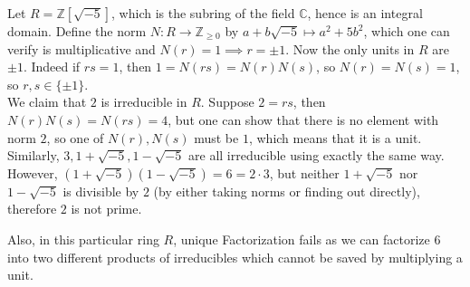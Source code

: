 \begin{example}
    Let $R=\mathbb Z[\sqrt{-5}]$, which is the subring of the field $\mathbb C$, hence is an integral domain.
    Define the norm $N:R\to\mathbb Z_{\ge 0}$ by $a+b\sqrt{-5}\mapsto a^2+5b^2$, which one can verify is multiplicative and $N(r)=1\implies r=\pm 1$.
    Now the only units in $R$ are $\pm 1$.
    Indeed if $rs=1$, then $1=N(rs)=N(r)N(s)$, so $N(r)=N(s)=1$, so $r,s\in\{\pm 1\}$.\\
    We claim that $2$ is irreducible in $R$.
    Suppose $2=rs$, then $N(r)N(s)=N(rs)=4$, but one can show that there is no element with norm $2$, so one of $N(r),N(s)$ must be $1$, which means that it is a unit.
    Similarly, $3,1+\sqrt{-5},1-\sqrt{-5}$ are all irreducible using exactly the same way.
    However, $(1+\sqrt{-5})(1-\sqrt{-5})=6=2\cdot 3$, but neither $1+\sqrt{-5}$ nor $1-\sqrt{-5}$ is divisible by $2$ (by either taking norms or finding out directly), therefore $2$ is not prime.
\end{example}
Also, in this particular ring $R$, unique Factorization fails as we can factorize $6$ into two different products of irreducibles which cannot be saved by multiplying a unit.
